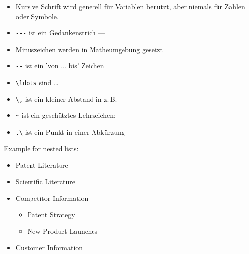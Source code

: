 \begin{itemize}
\item Kursive Schrift wird generell für Variablen benutzt, aber niemals für Zahlen oder Symbole.
\item \verb+---+ ist ein Gedankenstrich ---
\item {} Minuszeichen werden in Matheumgebung gesetzt
\item \verb+--+ ist ein 'von ... bis' Zeichen
\item \verb+\ldots+ sind \ldots
\item \verb+\,+ ist ein kleiner Abstand in z.\,B.
\item \verb+~+ ist ein geschütztes Lehrzeichen: 
\item \verb+.\+ ist ein Punkt in einer Abkürzung
\end{itemize}




Example for nested lists:
\begin{itemize}
    \item Patent Literature
    \item Scientific Literature
    \item Competitor Information
        \begin{itemize} 
        \item Patent Strategy
        \item New Product Launches
        \end{itemize}
    \item Customer Information
\end{itemize}


\newcommand{\note}[1]{\marginpar[]{\emph{\large{#1}}}}
\note{Randnotiz}



